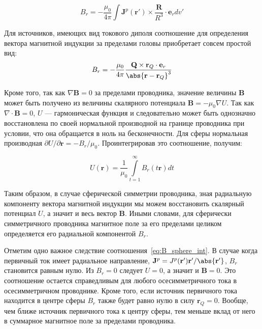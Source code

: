 \begin{equation}
    B_r = {-\frac{\mu_0}{4\pi}\int \mathbf{J}^p(\mathbf{r}')
    \times \frac{\mathbf{R}}{R^3}\cdot \mathbf{e}_r dv'}
    \label{eq:B_sphere_int}
\end{equation}


Для источников, имеющих вид токового диполя соотношение для определения вектора магнитной индукции
за пределами головы приобретает совсем простой вид:
\begin{equation}
    B_r = {-\frac{\mu_0}{4\pi}
    \frac{\mathbf{Q} \times \mathbf{r}_Q \cdot \mathbf{e}_r}
         {\abs{\mathbf{r} - \mathbf{r}_Q}^3}}
\end{equation}

Кроме того, так как $\nabla \mathbf{B} = 0$ за пределами проводника, значение величины $\mathbf{B}$
может быть получено из величины скалярного потенциала $\mathbf{B} = {-\mu_0 \nabla U}$.
Так как $\nabla \cdot \mathbf{B} = 0$, $U$ --- гармоническая функция и следовательно может быть однозначно
восстановлена по своей нормальной производной на границе проводника при условии, что она обращается
в ноль на бесконечности. Для сферы нормальная производная $\partial U / \partial \mathbf{r} = {-B_r / \mu_0}$.
Проинтегрировав это соотношение, получим:

\begin{equation}
    U(\mathbf{r}) = \frac{1}{\mu_0} \int \limits_{t=1}^{\infty} B_r(t\mathbf{r})dt
\end{equation}

Таким образом, в случае сферической симметрии проводника, зная радиальную компоненту вектора
магнитной индукции мы можем восстановить скалярный потенциал $U$, а значит и весь вектор $\mathbf{B}$.
Иными словами, для сферически симметричного проводника магнитное поле за его пределами
целиком определяется его радиальной компонентой $B_r$.

Отметим одно важное следствие соотношения~\ref{eq:B_sphere_int}. В случае когда первичный ток имеет
радиальное направление, $\mathbf{J}^p = J^p(\mathbf{r}') \mathbf{r}'/\abs{\mathbf{r}'}$,
$B_r$ становится равным нулю. Из $B_r=0$ следует $U = 0$, а значит и $\mathbf{B}=0$.
Это соотношение остается справедливым для любого осесимметричного тока в осесимметричном проводнике.
Кроме того, если источник первичного тока находится в центре сферы $B_r$ также
будет равно нулю в силу $\mathbf{r}_Q = 0$. Вообще, чем ближе источник первичного тока к центру сферы,
тем меньше вклад от него в суммарное магнитное поле за пределами проводника.

